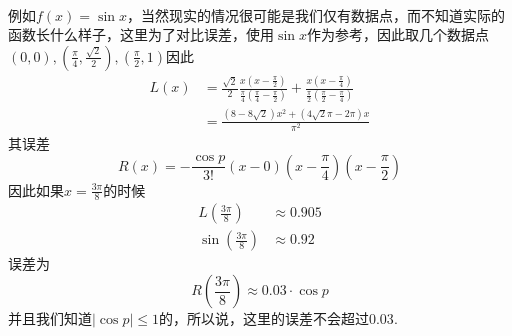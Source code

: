 \paragraph{}
例如$f(x) = \sin{x}$，当然现实的情况很可能是我们仅有数据点，而不知道实际的函数长什么样子，这里为了对比误差，使用$\sin{x}$作为参考，因此取几个数据点$(0, 0), (\frac{\pi}{4}, \frac{\sqrt{2}}{2}), (\frac{\pi}{2}, 1)$因此
\begin{align*}
L(x) & = \frac{\sqrt{2}}{2} \frac{x (x - \frac{\pi}{2})}{\frac{\pi}{4}  (\frac{\pi}{4} - \frac{\pi}{2})} + \frac{x (x - \frac{\pi}{4})}{\frac{\pi}{2} (\frac{\pi}{2} - \frac{\pi}{4})} \\
	   & = \frac{(8 - 8\sqrt{2}) x^2 + (4\sqrt{2} \pi -2 \pi) x}{\pi^2} 
\end{align*}
其误差
$$
R(x) = - \frac{\cos{p}}{3!} (x - 0) (x - \frac{\pi}{4}) (x - \frac{\pi}{2})
$$
因此如果$x = \frac{3 \pi}{8}$的时候
\begin{align*}
L( \frac{3 \pi}{8}) &  \approx  0.905 \\
\sin{( \frac{3 \pi}{8})} &  \approx 0.92 
\end{align*}
误差为
$$
R( \frac{3 \pi}{8} ) \approx  0.03\cdot \cos{p}
$$
并且我们知道$|\cos{p}| \leq 1$的，所以说，这里的误差不会超过$0.03$.